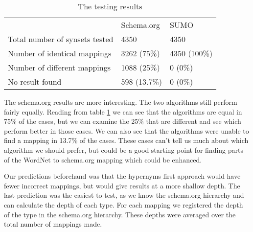 \begin{table}[ht] %
	\centering
	\begin{tabular}{lll}
										& Schema.org	& SUMO			\\
		Total number of synsets tested 	& 4350			& 4350			\\
		Number of identical mappings 	& 3262 (75\%)	& 4350 (100\%)	\\
		Number  of different mappings	& 1088 (25\%)	& 0	(0\%)		\\
		No result found					& 598  (13.7\%)	& 0	(0\%)
	\end{tabular}
	\caption{The testing results}
	\label{table:AlgorithmResults}
\end{table}

The schema.org results are more interesting.
The two algorithms still perform fairly equally.
Reading from table \ref{table:AlgorithmResults} we can see that the algorithms are equal in 75\% of the cases,
but we can examine the 25\% that are different and see which perform better in those cases.
We can also see that the algorithms were unable to find a mapping in 13.7\% of the cases.
These cases can't tell us much about which algorithm we should prefer,
but could be a good starting point for finding parts of the WordNet to schema.org mapping which could be enhanced.

Our predictions beforehand was that the hypernyms first approach would have fewer incorrect mappings,
but would give results at a more shallow depth.
The last prediction was the easiest to test, as we know the schema.org hierarchy and can calculate the depth of each type.
For each mapping we registered the depth of the type in the schema.org hierarchy.
These depths were averaged over the total number of mappings made.

